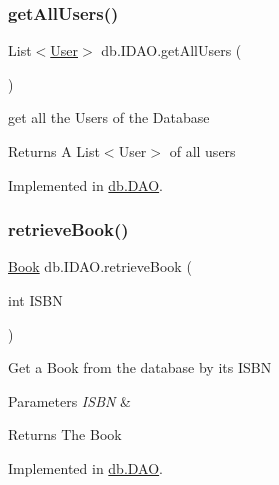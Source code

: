 \subsubsection{\texorpdfstring{get\+All\+Users()}{getAllUsers()}}
{\footnotesize\ttfamily List$<$\hyperlink{classserver_1_1data_1_1_user}{User}$>$ db.\+I\+D\+A\+O.\+get\+All\+Users (\begin{DoxyParamCaption}{ }\end{DoxyParamCaption})}

get all the Users of the Database \begin{DoxyReturn}{Returns}
A List$<$\+User$>$ of all users 
\end{DoxyReturn}


Implemented in \hyperlink{classdb_1_1_d_a_o_a3b627b7177990799fd02e0c38b8adb70}{db.\+D\+AO}.

\mbox{\label{interfacedb_1_1_i_d_a_o_a1457ecf91799eaacd17cd3259826fc36}} 
\subsubsection{\texorpdfstring{retrieve\+Book()}{retrieveBook()}}
{\footnotesize\ttfamily \hyperlink{classserver_1_1data_1_1_book}{Book} db.\+I\+D\+A\+O.\+retrieve\+Book (\begin{DoxyParamCaption}\item[{int}]{I\+S\+BN }\end{DoxyParamCaption})}

Get a Book from the database by its I\+S\+BN 
\begin{DoxyParams}{Parameters}
{\em I\+S\+BN} & \\
\hline
\end{DoxyParams}
\begin{DoxyReturn}{Returns}
The Book 
\end{DoxyReturn}


Implemented in \hyperlink{classdb_1_1_d_a_o_ade778f907d0a74dc27c4fc03f8709815}{db.\+D\+AO}.

\mbox{\label{interfacedb_1_1_i_d_a_o_a4c5eda35bfbba1b0a994efe00f99a544}} 
